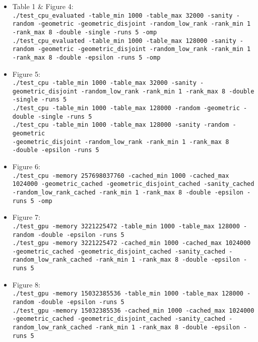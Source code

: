 \documentclass[format=acmsmall,review=false, screen=true]{acmart}
\begin{document}
\begin{itemize}
\raggedright
\item Table 1 \& Figure 4:\\
\small{\texttt{./test\_cpu\_evaluated -table\_min 1000 -table\_max 32000 -sanity -random -geometric -geometric\_disjoint -random\_low\_rank -rank\_min 1 -rank\_max 8 -double -single -runs 5 -omp}\\
\texttt{./test\_cpu\_evaluated -table\_min 1000 -table\_max 128000 -sanity -random -geometric -geometric\_disjoint -random\_low\_rank -rank\_min 1 -rank\_max 8 -double -epsilon -runs 5 -omp}}
\item Figure 5:\\
\small{\texttt{./test\_cpu -table\_min 1000 -table\_max 32000 -sanity -geometric\_disjoint -random\_low\_rank -rank\_min 1 -rank\_max 8 -double -single -runs 5}\\
\texttt{./test\_cpu -table\_min 1000 -table\_max 128000 -random -geometric -double -single -runs 5}\\
\texttt{./test\_cpu -table\_min 1000 -table\_max 128000 -sanity -random -geometric\\ -geometric\_disjoint  -random\_low\_rank -rank\_min 1 -rank\_max 8\\ -double -epsilon -runs 5}}
\item Figure 6:\\
\small{\texttt{./test\_cpu -memory 257698037760 -cached\_min 1000 -cached\_max 1024000 -geometric\_cached -geometric\_disjoint\_cached -sanity\_cached -random\_low\_rank\_cached -rank\_min 1 -rank\_max 8 -double -epsilon -runs 5 -omp}}
\item Figure 7:\\
\small{\texttt{./test\_gpu -memory 3221225472 -table\_min 1000 -table\_max 128000 -random -double -epsilon -runs 5}\\
\texttt{./test\_gpu -memory 3221225472 -cached\_min 1000 -cached\_max 1024000 -geometric\_cached -geometric\_disjoint\_cached -sanity\_cached -random\_low\_rank\_cached -rank\_min 1 -rank\_max 8 -double -epsilon -runs 5}}
\item Figure 8:\\
\small{\texttt{./test\_gpu -memory 15032385536 -table\_min 1000 -table\_max 128000 -random -double -epsilon -runs 5}\\
\texttt{./test\_gpu -memory 15032385536 -cached\_min 1000 -cached\_max 1024000 -geometric\_cached -geometric\_disjoint\_cached -sanity\_cached -random\_low\_rank\_cached -rank\_min 1 -rank\_max 8 -double -epsilon -runs 5}}

\end{itemize}
\end{document}
